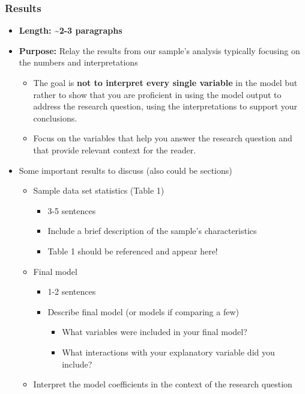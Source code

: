\documentclass[
  letterpaper,
  DIV=11,
  numbers=noendperiod]{scrartcl}
\providecommand{\tightlist}{%
  \setlength{\itemsep}{0pt}\setlength{\parskip}{0pt}}\usepackage{longtable,booktabs,array}
\begin{document}
\hypertarget{results}{%
\subsubsection{Results}\label{results}}

\begin{itemize}
\tightlist
\item
  \textbf{Length: \textasciitilde2-3 paragraphs}
\item
  \textbf{Purpose:} Relay the results from our sample's analysis
  typically focusing on the numbers and interpretations

  \begin{itemize}
  \tightlist
  \item
    The goal is \textbf{not to interpret every single variable} in the
    model but rather to show that you are proficient in using the model
    output to address the research question, using the interpretations
    to support your conclusions.
  \item
    Focus on the variables that help you answer the research question
    and that provide relevant context for the reader.
  \end{itemize}
\item
  Some important results to discuss (also could be sections)

  \begin{itemize}
  \tightlist
  \item
    Sample data set statistics (Table 1)

    \begin{itemize}
    \tightlist
    \item
      3-5 sentences
    \item
      Include a brief description of the sample's characteristics
    \item
      Table 1 should be referenced and appear here!
    \end{itemize}
  \item
    Final model

    \begin{itemize}
    \tightlist
    \item
      1-2 sentences
    \item
      Describe final model (or models if comparing a few)

      \begin{itemize}
      \tightlist
      \item
        What variables were included in your final model?
      \item
        What interactions with your explanatory variable did you
        include?
      \end{itemize}
    \end{itemize}
  \item
    Interpret the model coefficients in the context of the research
    question


\end{itemize}
\end{itemize}
\end{document}
